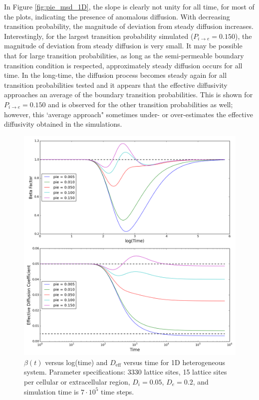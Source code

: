 	 In Figure \ref{fig:pie_msd_1D}, the slope is clearly not unity for all time, for most of the plots, indicating the presence of anomalous diffusion. With decreasing transition probability, the magnitude of deviation from steady diffusion increases. Interestingly, for the largest transition probability simulated ($ P_{i \rightarrow e} = 0.150 $), the magnitude of deviation from steady diffusion is very small. It may be possible that for large transition probabilities, as long as the semi-permeable boundary transition condition is respected, approximately steady diffusion occurs for all time. In the long-time, the diffusion process becomes steady again for all transition probabilities tested and it appears that the effective diffusivity approaches an average of the boundary transition probabilities. This is shown for $ P_{i \rightarrow e} = 0.150 $ and is observed for the other transition probabilities as well; however, this `average approach" sometimes under- or over-estimates the effective diffusivity obtained in the simulations.
	
	\begin{figure}[h!]
		\centering
		\includegraphics[width=1.0\linewidth]{../images/1D/pie_beta_deff_1D}
		\caption{$ \beta (t) $ versus log(time) and $ D_\textrm{eff} $ versus time for 1D heterogeneous system. Parameter specifications: 3330 lattice sites, 15 lattice sites per cellular or extracellular region, $ D_i = 0.05 $, $ D_e = 0.2 $, and simulation time is $ 7\cdot 10^5 $ time steps.}
		\label{fig:pie_beta_deff_1D}
	\end{figure}

